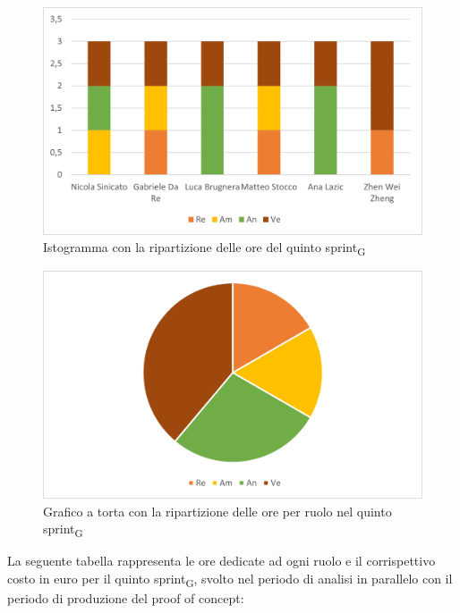 \begin{figure}[H]
	\centering
	\includegraphics[scale=0.6]{img/grafi preventivo/istogrammi/analisi/sprint5.png}
	\caption{Istogramma con la ripartizione delle ore del quinto sprint\textsubscript{G}}
\end{figure}
\begin{figure}[H]
	\centering
	\includegraphics[scale=0.6]{img/grafi preventivo/torta/analisi/sprint5.png}
	\caption{Grafico a torta con la ripartizione delle ore per ruolo nel quinto sprint\textsubscript{G}}
\end{figure}
La seguente tabella rappresenta le ore dedicate ad ogni ruolo e il corrispettivo costo in euro per il quinto sprint\textsubscript{G}, svolto nel periodo di analisi in parallelo con il periodo di produzione del proof of concept:

